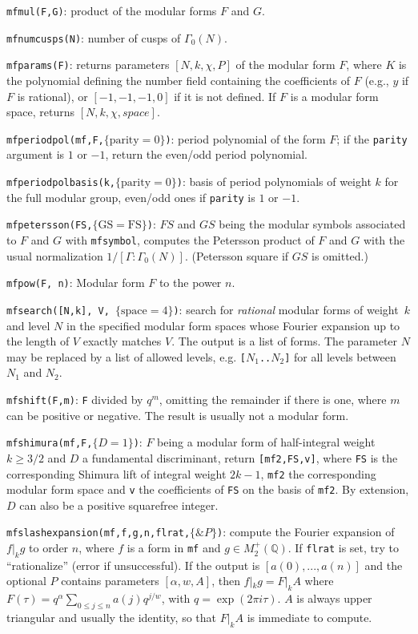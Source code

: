 \documentclass[11pt]{article}
\newcommand{\Q}{{\mathbb Q}}
\newcommand{\al}{\alpha}
\newcommand{\G}{\Gamma}
\def\kbd#1{{\tt #1}}
\begin{document}
\f\kbd{mfmul(F,G)}: product of the modular forms $F$ and $G$.

\f\kbd{mfnumcusps(N)}: number of cusps of $\G_0(N)$.

\f\kbd{mfparams(F)}: returns parameters $[N,k,\chi,P]$ of the modular form $F$,
where $K$ is the polynomial defining the number field containing the
coefficients of $F$ (e.g., $y$ if $F$ is rational), or $[-1,-1,-1,0]$ if
it is not defined. If $F$ is a modular form space, returns $[N,k,\chi,space]$.

\f\kbd{mfperiodpol(mf,F,$\{\text{parity}=0\}$)}: period polynomial of the
form $F$; if the \kbd{parity} argument is $1$ or $-1$, return the even/odd
period polynomial.

\f\kbd{mfperiodpolbasis(k,$\{\text{parity}=0\}$)}: basis of period polynomials of weight
$k$ for the full modular group, even/odd ones if \kbd{parity} is $1$ or $-1$.

\f\kbd{mfpetersson(FS,$\{\text{GS}=\text{FS}\}$)}: $FS$ and $GS$ being the modular symbols associated
to $F$ and $G$ with \kbd{mfsymbol}, computes the Petersson product of $F$ and
$G$ with the usual normalization $1/[\G:\G_0(N)]$. (Petersson square if $GS$
is omitted.)

\f\kbd{mfpow(F, n)}: Modular form $F$ to the power $n$.

\f\kbd{mfsearch([N,k], V, $\{\text{space}=4\}$)}: search for \emph{rational}
modular forms of weight~$k$ and level $N$ in the specified modular
form spaces whose Fourier expansion up to the length of $V$ exactly matches
$V$. The output is a list of forms. The parameter $N$ may be replaced
by a list of allowed levels, e.g. \kbd{[$N_1$..$N_2$]} for all levels
between $N_1$ and $N_2$.

\f\kbd{mfshift(F,m)}: \kbd{F} divided by $q^m$, omitting the remainder if there
is one, where $m$ can be positive or negative. The result is usually not
a modular form.

\f\kbd{mfshimura(mf,F,$\{D = 1\}$)}: $F$ being a modular form of
half-integral weight $k\ge3/2$ and $D$ a fundamental discriminant, return
\kbd{[mf2,FS,v]}, where \kbd{FS} is the corresponding Shimura lift of integral
weight $2k-1$, \kbd{mf2} the corresponding modular form space and \kbd{v} the
coefficients of \kbd{FS} on the basis of \kbd{mf2}. By extension, $D$ can also
be a positive squarefree integer.

\f\kbd{mfslashexpansion(mf,f,g,n,flrat,$\{\&P\}$)}: compute the Fourier
expansion of $f|_k g$ to order $n$, where $f$ is a form in \kbd{mf} and
$g\in M_2^+(\Q)$. If \kbd{flrat} is set, try to ``rationalize''
(error if unsuccessful). If the output is $[a(0),...,a(n)]$ and the
optional $P$ contains parameters $[\al,w,A]$, then $f|_k g = F|_k A$
where
$F(\tau) = q^{\al}\sum_{0\le j\le n}a(j)q^{j/w}$, with $q=\exp(2\pi i\tau)$.
$A$ is always upper triangular and usually the identity, so that $F|_k A$
is immediate to compute.
\end{document}

